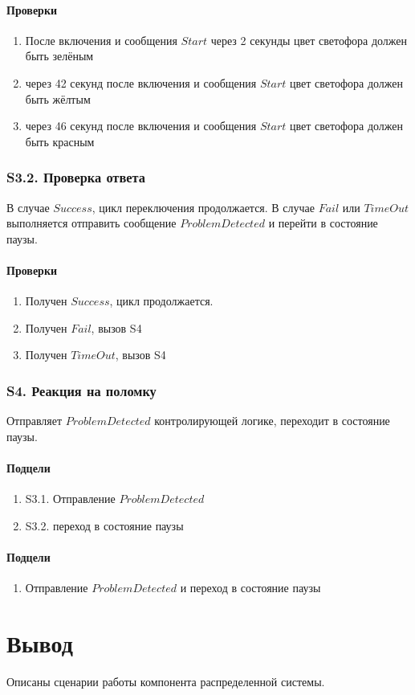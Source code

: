 		\paragraph{Проверки}
			\begin{enumerate}
				\item После включения и сообщения $ Start $ через 2 секунды цвет светофора должен быть зелёным
				\item  через 42  секунд после включения и сообщения $ Start $ цвет светофора должен быть жёлтым
				\item  через 46 секунд после включения и сообщения $ Start $ цвет светофора должен быть красным
			\end{enumerate}
		\subsubsection{S3.2. Проверка ответа}
			В случае $ Success $, цикл переключения продолжается. В случае $ Fail $ или $ TimeOut $ выполняется отправить сообщение $ ProblemDetected $ и перейти в состояние паузы.
				\paragraph{Проверки}
				\begin{enumerate}
					\item Получен $ Success $, цикл продолжается.
					\item Получен  $ Fail $, вызов S4
					\item Получен  $ TimeOut $, вызов S4
				\end{enumerate}
			
		\subsubsection{S4. Реакция на поломку}
			Отправляет $ ProblemDetected $ контролирующей логике, переходит в состояние паузы.
			\paragraph{Подцели}
				\begin{enumerate}
					\item S3.1. Отправление $ ProblemDetected $
					\item S3.2. переход в состояние паузы
				\end{enumerate}
			\paragraph{Подцели}
				\begin{enumerate}
					\item Отправление $ ProblemDetected $ и переход в состояние паузы
				\end{enumerate}
	\section{Вывод}
			Описаны сценарии работы компонента распределенной системы.